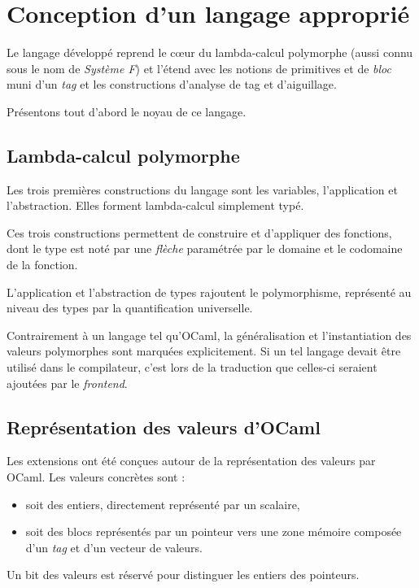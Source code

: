 \section{Conception d'un langage approprié}

Le langage développé reprend le cœur du lambda-calcul polymorphe
\cite{Reynolds94anintroduction} (aussi connu sous le nom de \emph{Système F})
et l'étend avec les notions de primitives et de \emph{bloc} muni d'un
\emph{tag} et les constructions d'analyse de tag et d'aiguillage.

Présentons tout d'abord le noyau de ce langage.

\subsection{Lambda-calcul polymorphe} 

Les trois premières constructions du langage sont les variables, l'application
et l'abstraction. Elles forment lambda-calcul simplement typé.

Ces trois constructions permettent de construire et d'appliquer des fonctions,
dont le type est noté par une \emph{flèche} paramétrée par le domaine et le
codomaine de la fonction.

L'application et l'abstraction de types rajoutent le polymorphisme, représenté
au niveau des types par la quantification universelle.

Contrairement à un langage tel qu'OCaml, la généralisation et l'instantiation
des valeurs polymorphes sont marquées explicitement. Si un tel langage devait
être utilisé dans le compilateur, c'est lors de la traduction que celles-ci
seraient ajoutées par le \emph{frontend}.

\subsection{Représentation des valeurs d'OCaml}

Les extensions ont été conçues autour de la représentation des valeurs par
OCaml. Les valeurs concrètes sont :
\begin{itemize}
  \item soit des entiers, directement représenté par un scalaire,
  \item soit des blocs représentés par un pointeur vers une
zone mémoire composée d'un \emph{tag} et d'un vecteur de valeurs.
\end{itemize}
Un bit des valeurs est réservé pour distinguer les entiers des pointeurs.

